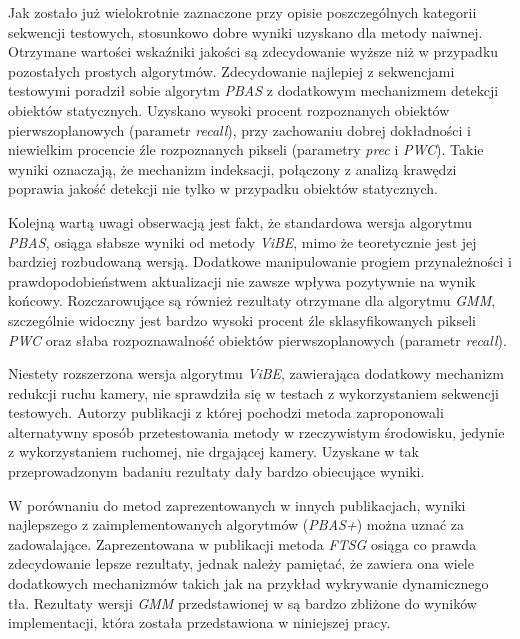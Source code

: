 Jak zostało już wielokrotnie zaznaczone przy opisie poszczególnych kategorii sekwencji testowych, stosunkowo dobre wyniki uzyskano dla metody naiwnej. 
Otrzymane wartości wskaźniki jakości są zdecydowanie wyższe niż w przypadku pozostałych prostych algorytmów. 
Zdecydowanie najlepiej z sekwencjami testowymi poradził sobie algorytm \textit{PBAS} z dodatkowym mechanizmem detekcji obiektów statycznych.
Uzyskano wysoki procent rozpoznanych obiektów pierwszoplanowych (parametr \textit{recall}), przy zachowaniu dobrej dokładności i niewielkim procencie źle rozpoznanych pikseli (parametry \textit{prec} i \textit{PWC}). 
Takie wyniki oznaczają, że mechanizm indeksacji, połączony z analizą krawędzi poprawia jakość detekcji nie tylko w przypadku obiektów statycznych. 

Kolejną wartą uwagi obserwacją jest fakt, że standardowa wersja algorytmu \textit{PBAS}, osiąga słabsze wyniki od metody \textit{ViBE}, mimo że teoretycznie jest jej bardziej rozbudowaną wersją. %
Dodatkowe manipulowanie progiem przynależności i prawdopodobieństwem aktualizacji nie zawsze wpływa pozytywnie na wynik końcowy. 
Rozczarowujące są również rezultaty otrzymane dla algorytmu \textit{GMM}, szczególnie widoczny jest bardzo wysoki procent źle sklasyfikowanych pikseli \textit{PWC} oraz słaba rozpoznawalność obiektów pierwszoplanowych (parametr \textit{recall}).

Niestety rozszerzona wersja algorytmu \textit{ViBE}, zawierająca dodatkowy mechanizm redukcji ruchu kamery, nie sprawdziła się w testach z wykorzystaniem sekwencji testowych. 
Autorzy publikacji \cite{kryjak_14_vibe} z której pochodzi metoda zaproponowali alternatywny sposób przetestowania metody w rzeczywistym środowisku, jedynie z wykorzystaniem ruchomej, nie drgającej kamery. 
Uzyskane w tak przeprowadzonym badaniu rezultaty dały bardzo obiecujące wyniki.


W porównaniu do metod zaprezentowanych w innych publikacjach, wyniki najlepszego z zaimplementowanych algorytmów (\textit{PBAS+}) można uznać za zadowalające. 
Zaprezentowana w publikacji \cite{wang_14} metoda \textit{FTSG} osiąga co prawda zdecydowanie lepsze rezultaty, jednak należy pamiętać, że zawiera ona wiele dodatkowych mechanizmów takich jak na przykład wykrywanie dynamicznego tła. 
Rezultaty wersji \textit{GMM} przedstawionej w \cite{} są bardzo zbliżone do wyników implementacji, która została przedstawiona w niniejszej pracy.
